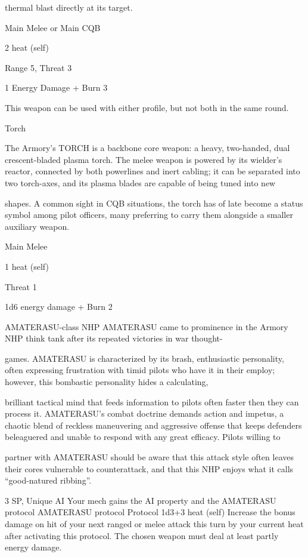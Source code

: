 thermal blast directly at its target.  

Main Melee or Main CQB
 
2 heat (self)
 
Range 5, Threat 3
 
1 Energy Damage + Burn 3
 

                                                                                                                     


This weapon can be used with either profile, but not both in the same round.
 

Torch  

The Armory’s TORCH is a backbone core weapon: a heavy, two-handed, dual crescent-bladed plasma  
torch. The melee weapon is powered by its wielder’s reactor, connected by both powerlines and inert  
cabling; it can be separated into two torch-axes, and its plasma blades are capable of being tuned into new  

shapes. A common sight in CQB situations, the torch has of late become a status symbol among pilot  
officers, many preferring to carry them alongside a smaller auxiliary weapon.    

Main Melee
 
1 heat (self)
 
Threat 1
 
1d6 energy damage + Burn 2
 

AMATERASU-class NHP  
AMATERASU came to prominence in the Armory NHP think tank after its repeated victories in war thought- 

games. AMATERASU is characterized by its brash, enthusiastic personality, often expressing frustration  
with timid pilots who have it in their employ; however, this bombastic personality hides a calculating,  

brilliant tactical mind that feeds information to pilots often faster then they can process it. AMATERASU’s  
combat doctrine demands action and impetus, a chaotic blend of reckless maneuvering and aggressive  
offense that keeps defenders beleaguered and unable to respond with any great efficacy. Pilots willing to  

partner with AMATERASU should be aware that this attack style often leaves their cores vulnerable to  
counterattack, and that this NHP enjoys what it calls “good-natured ribbing”.    

3 SP, Unique 
AI 
Your mech gains the AI property and the AMATERASU protocol 
	        AMATERASU protocol 
	        Protocol 
	        1d3+3 heat (self) 
         Increase the bonus damage on hit of your next ranged or melee attack this turn by your  
         current heat after activating this protocol. The chosen weapon must deal at least partly  
         energy damage. 

                                                                                                              

